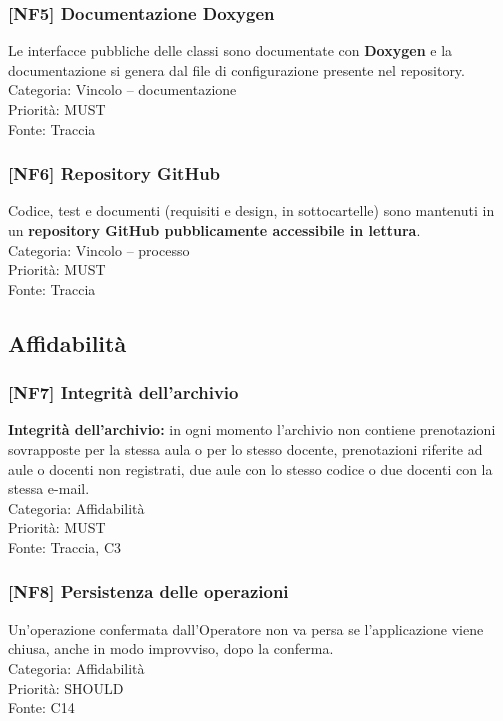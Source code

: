 \subsubsection{[NF5] Documentazione Doxygen}
Le interfacce pubbliche delle classi sono documentate con \textbf{Doxygen} e la documentazione si genera dal file di configurazione presente nel repository.\\
Categoria: Vincolo – documentazione\\Priorità: MUST\\Fonte: Traccia

\subsubsection{[NF6] Repository GitHub}
Codice, test e documenti (requisiti e design, in sottocartelle) sono mantenuti in un \textbf{repository GitHub pubblicamente accessibile in lettura}.\\
Categoria: Vincolo – processo\\Priorità: MUST\\Fonte: Traccia

\subsection{Affidabilità}
\subsubsection{[NF7] Integrità dell'archivio}
\textbf{Integrità dell'archivio:} in ogni momento l'archivio non contiene prenotazioni sovrapposte per la stessa aula o per lo stesso docente, prenotazioni riferite ad aule o docenti non registrati, due aule con lo stesso codice o due docenti con la stessa e-mail.\\
Categoria: Affidabilità\\Priorità: MUST\\Fonte: Traccia, C3

\subsubsection{[NF8] Persistenza delle operazioni}
Un'operazione confermata dall'Operatore non va persa se l'applicazione viene chiusa, anche in modo improvviso, dopo la conferma.\\
Categoria: Affidabilità\\Priorità: SHOULD\\Fonte: C14

